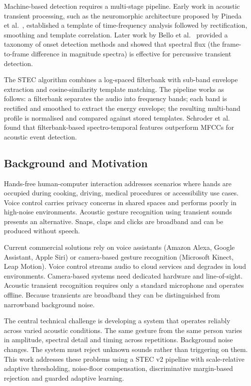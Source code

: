 \documentclass[12pt,a4paper]{article}
\begin{document}
Machine-based detection requires a multi-stage pipeline. Early work in acoustic transient processing, such as the neuromorphic architecture proposed by Pineda et al.~\cite{pineda1996}, established a template of time-frequency analysis followed by rectification, smoothing and template correlation. Later work by Bello et al.~\cite{bello2005} provided a taxonomy of onset detection methods and showed that spectral flux (the frame-to-frame difference in magnitude spectra) is effective for percussive transient detection.

The STEC algorithm combines a log-spaced filterbank with sub-band envelope extraction and cosine-similarity template matching. The pipeline works as follows: a filterbank separates the audio into frequency bands; each band is rectified and smoothed to extract the energy envelope; the resulting multi-band profile is normalised and compared against stored templates. Schroder et al.~\cite{schroder2015} found that filterbank-based spectro-temporal features outperform MFCCs for acoustic event detection.

\subsection{Background and Motivation}

Hands-free human-computer interaction addresses scenarios where hands are occupied during cooking, driving, medical procedures or accessibility use cases. Voice control carries privacy concerns in shared spaces and performs poorly in high-noise environments. Acoustic gesture recognition using transient sounds presents an alternative. Snaps, claps and clicks are broadband and can be produced without speech.

Current commercial solutions rely on voice assistants (Amazon Alexa, Google Assistant, Apple Siri) or camera-based gesture recognition (Microsoft Kinect, Leap Motion). Voice control streams audio to cloud services and degrades in loud environments. Camera-based systems need dedicated hardware and line-of-sight. Acoustic transient recognition requires only a standard microphone and operates offline. Because transients are broadband they can be distinguished from narrowband background noise.

The central technical challenge is developing a system that operates reliably across varied acoustic conditions. The same gesture from the same person varies in amplitude, spectral detail and timing across repetitions. Background noise changes. The system must reject unknown sounds rather than triggering on them. This work addresses these problems using a STEC v2 pipeline with scale-relative adaptive thresholding, noise-floor compensation, discriminative margin-based rejection and guarded adaptive learning.
\end{document}
